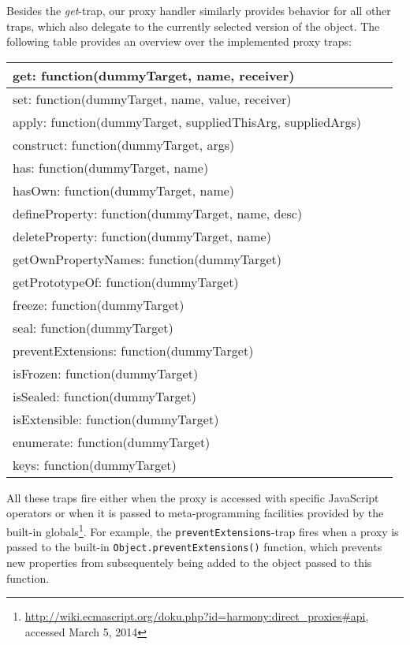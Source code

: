 Besides the \emph{get}-trap, our proxy handler similarly provides behavior for all other traps, which also delegate to the currently selected version of the object.
The following table provides an overview over the implemented proxy traps:

\begin{table}[h]
\begin{tabular}{|l|l|r|}
\hline
get: function(dummyTarget, name, receiver) \\ \hline
set: function(dummyTarget, name, value, receiver) \\ \hline
apply: function(dummyTarget, suppliedThisArg, suppliedArgs) \\ \hline
construct: function(dummyTarget, args) \\ \hline
has: function(dummyTarget, name) \\ \hline
hasOwn: function(dummyTarget, name) \\ \hline
defineProperty: function(dummyTarget, name, desc) \\ \hline
deleteProperty: function(dummyTarget, name) \\ \hline
getOwnPropertyNames: function(dummyTarget) \\ \hline
getPrototypeOf: function(dummyTarget) \\ \hline
freeze: function(dummyTarget) \\ \hline
seal: function(dummyTarget) \\ \hline
preventExtensions: function(dummyTarget) \\ \hline
isFrozen: function(dummyTarget) \\ \hline
isSealed: function(dummyTarget) \\ \hline
isExtensible: function(dummyTarget) \\ \hline
enumerate: function(dummyTarget) \\ \hline
keys: function(dummyTarget) \\ \hline
\end{tabular}
\end{table}

All these traps fire either when the proxy is accessed with specific JavaScript operators or when it is passed to meta-programming facilities provided by the built-in globals\footnote{\url{http://wiki.ecmascript.org/doku.php?id=harmony:direct_proxies\#api}, accessed March 5, 2014}.
For example, the \lstinline{preventExtensions}-trap fires when a proxy is passed to the built-in \lstinline{Object.preventExtensions()} function, which prevents new properties from subsequentely being added to the object passed to this function.

